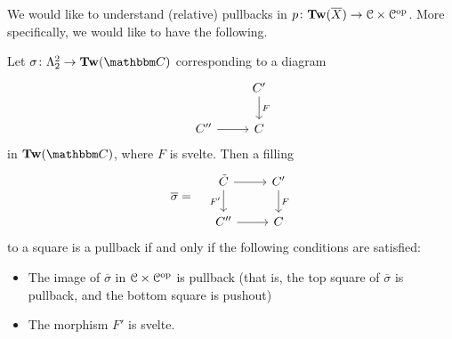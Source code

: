 \documentclass[main.tex]{subfiles}
\begin{document}
We would like to understand (relative) pullbacks in $p\colon \mathbf{Tw}(\overline{X}) \to \mathcal{C} \times \mathcal{C}^{\mathrm{op}}$. More specifically, we would like to have the following.

\begin{proposition}
  Let $\sigma\colon \Lambda^{2}_{2} \to \Tw(\CC)$ corresponding to a diagram
  \begin{equation*}
    \begin{tikzcd}
      & C'
      \arrow[d, "F"]
      \\
      C''
      \arrow[r]
      & C
    \end{tikzcd}
  \end{equation*}
  in $\Tw(\CC)$, where $F$ is svelte. Then a filling
  \begin{equation*}
    \overline{\sigma} = \quad
    \begin{tikzcd}
      \tilde{C}
      \arrow[r]
      \arrow[d, swap, "F'"]
      & C'
      \arrow[d, "F"]
      \\
      C''
      \arrow[r]
      & C
    \end{tikzcd}
  \end{equation*}
  to a square is a pullback if and only if the following conditions are satisfied:
  \begin{itemize}
    \item The image of $\overline{\sigma}$ in $\mathcal{C} \times \mathcal{C}^{\mathrm{op}}$ is pullback (that is, the top square of $\overline{\sigma}$ is pullback, and the bottom square is pushout)

    \item The morphism $F'$ is svelte.
  \end{itemize}
\end{proposition}
\end{document}
